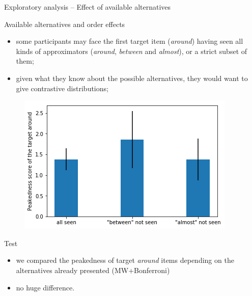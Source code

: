 \documentclass[xcolor=table, hyperref={pdfpagelabels=false}]{beamer}
\begin{document}
\begin{frame}{Exploratory analysis -- Effect of available alternatives}
\begin{block}{Available alternatives and order effects}
	\begin{itemize}
		\item some participants may face the first target item (\textit{around}) having seen all kinds of approximators (\textit{around}, \textit{between} and \textit{almost}), or a strict subset of them;
		\item given what they know about the possible alternatives, they would want to give contrastive distributions;
	\end{itemize}
\end{block}
\begin{minipage}{.45\textwidth}
	\begin{figure}
		\centering
	\includegraphics[width=\textwidth]{./images/sensitivity_competitors.png}
\end{figure}
\end{minipage}\quad
\begin{minipage}{.5\textwidth}
	\begin{block}{Test}
		\begin{itemize}
			\item we compared the peakedness of target \textit{around} items depending on the alternatives already presented (MW+Bonferroni)
			\item no huge difference.
		\end{itemize}
	\end{block}
\end{minipage}
\end{frame}
\end{document}
